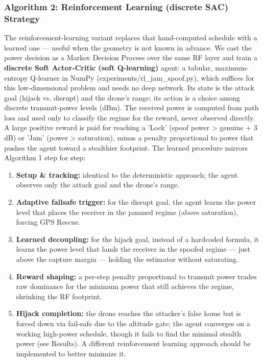 \documentclass[11pt]{article}
\begin{document}
\subsubsection*{Algorithm 2: Reinforcement Learning (discrete SAC) Strategy}
The reinforcement-learning variant replaces that hand-computed schedule with a learned one — useful when the geometry is not known in advance. We cast the power decision as a Markov Decision Process over the same RF layer and train a \textbf{discrete Soft Actor-Critic (soft Q-learning)} agent: a tabular, maximum-entropy Q-learner in NumPy (experiments/rl\_\allowbreak{}jam\_\allowbreak{}spoof.py), which suffices for this low-dimensional problem and needs no deep network. Its state is the attack goal (hijack vs. disrupt) and the drone's range; its action is a choice among discrete transmit-power levels (dBm). The received power is computed from path loss and used only to classify the regime for the reward, never observed directly. A large positive reward is paid for reaching a 'Lock' (spoof power > genuine + 3 dB) or 'Jam' (power > saturation), minus a penalty proportional to power that pushes the agent toward a stealthier footprint. The learned procedure mirrors Algorithm 1 step for step:
\begin{enumerate}
\item \textbf{Setup \& tracking:} identical to the deterministic approach; the agent observes only the attack goal and the drone's range.
\item \textbf{Adaptive failsafe trigger:} for the disrupt goal, the agent learns the power level that places the receiver in the jammed regime (above saturation), forcing GPS Rescue.
\item \textbf{Learned decoupling:} for the hijack goal, instead of a hardcoded formula, it learns the power level that lands the receiver in the spoofed regime — just above the capture margin — holding the estimator without saturating.
\item \textbf{Reward shaping:} a per-step penalty proportional to transmit power trades raw dominance for the minimum power that still achieves the regime, shrinking the RF footprint.
\item \textbf{Hijack completion:} the drone reaches the attacker's false home but is forced down via fail-safe due to the altitude gate; the agent converges on a working high-power schedule, though it fails to find the minimal stealth power (see Results). A different reinforcement learning approach should be implemented to better minimize it.
\end{enumerate}
\end{document}
